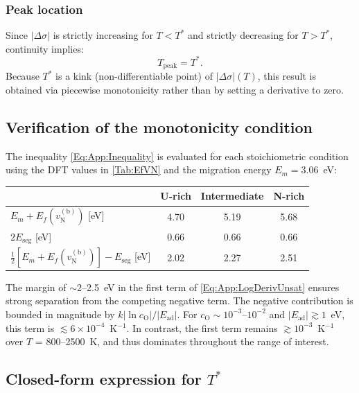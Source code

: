 \documentclass[preprint,12pt,sort&compress]{elsarticle}
\newcommand{\?}{\stackrel{?}{=}}
\begin{document}
\subsubsection{Peak location}

Since $|\Delta \sigma|$ is strictly increasing for $T < T^*$ and strictly decreasing for $T > T^*$, continuity implies:
\begin{equation}
T_\text{peak} = T^*.
\label{Eq:App:TpeakIsTstar}
\end{equation}
Because $T^*$ is a kink (non-differentiable point) of $|\Delta \sigma|(T)$, this result is obtained via piecewise monotonicity rather than by setting a derivative to zero.

\subsection{Verification of the monotonicity condition}
\label{App:Tpeak:Verification}

The inequality \cref{Eq:App:Inequality} is evaluated for each stoichiometric condition using the DFT values in \cref{Tab:EfVN} and the migration energy $E_m = 3.06$~eV:
\begin{table}
\footnotesize
\centering
\begin{tabular}{lccc}
\hline
 & U-rich & Intermediate & N-rich \\
\hline
$E_m + E_f(v_\text{N}^{(\text{b})})$ [eV] & 4.70 & 5.19 & 5.68 \\
$2E_\text{seg}$ [eV] & 0.66 & 0.66 & 0.66 \\
$\tfrac{1}{2}[E_m + E_f(v_\text{N}^{(\text{b})})] - E_\text{seg}$ [eV] & 2.02 & 2.27 & 2.51 \\
\hline
\end{tabular}
\end{table}
The margin of $\sim$2--2.5~eV in the first term of \cref{Eq:App:LogDerivUnsat} ensures strong separation from the competing negative term. The negative contribution is bounded in magnitude by $k|\ln c_\text{O}|/|E_\text{ad}|$. For $c_\text{O} \sim 10^{-3}$--$10^{-2}$ and $|E_\text{ad}| \gtrsim 1$~eV, this term is $\lesssim 6 \times 10^{-4}$~K$^{-1}$. In contrast, the first term remains $\gtrsim 10^{-3}$~K$^{-1}$ over $T$ = 800--2500~K, and thus dominates throughout the range of interest.

\subsection{Closed-form expression for \texorpdfstring{$T^*$}{T*}}
\label{App:Tpeak:Formula}
\end{document}
